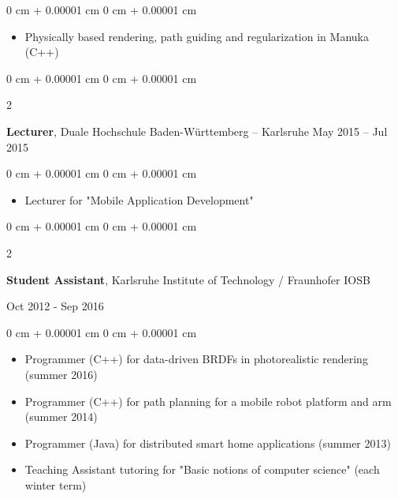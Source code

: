 \documentclass[10pt, letterpaper]{article}
\newenvironment{highlights}{
    \begin{itemize}[
        topsep=0.10 cm,
        parsep=0.10 cm,
        partopsep=0pt,
        itemsep=0pt,
        leftmargin=0 cm + 10pt
    ]
}{
    \end{itemize}
} %
\newenvironment{onecolentry}{
    \begin{adjustwidth}{
        0 cm + 0.00001 cm
    }{
        0 cm + 0.00001 cm
    }
}{
    \end{adjustwidth}
} %
\newenvironment{twocolentry}[2][]{
    \onecolentry
    \def\secondColumn{#2}
    \setcolumnwidth{\fill, 4.5 cm}
    \begin{paracol}{2}
}{
    \switchcolumn \raggedleft \secondColumn
    \end{paracol}
    \endonecolentry
} %
\begin{document}
        \vspace{0.10 cm}
        \begin{onecolentry}
            \begin{highlights}
                \item Physically based rendering, path guiding and regularization in Manuka (C++)
            \end{highlights}
        \end{onecolentry}

\expspace

        \begin{twocolentry}{
            May 2015 – Jul 2015
        }
            \textbf{Lecturer}, Duale Hochschule Baden-Württemberg -- Karlsruhe\end{twocolentry}

        \vspace{0.10 cm}
        \begin{onecolentry}
            \begin{highlights}
                \item Lecturer for "Mobile Application Development"
            \end{highlights}
        \end{onecolentry}
        
        \expspace
             
        \begin{twocolentry}{Oct 2012 - Sep 2016}
        \textbf{Student Assistant}, Karlsruhe Institute of Technology / Fraunhofer IOSB        
        \end{twocolentry}
        \vspace{0.10 cm}
        \begin{onecolentry}
        \begin{itemize}
              \item Programmer (C++) for data-driven BRDFs in photorealistic rendering (summer 2016) %
                \item Programmer (C++) for path planning for a mobile robot platform and arm (summer 2014)%
                \item Programmer (Java) for distributed smart home applications (summer 2013) %
                \item Teaching Assistant tutoring for "Basic notions of computer science" (each winter term)
                \end{itemize}
        \end{onecolentry}
\end{document}
